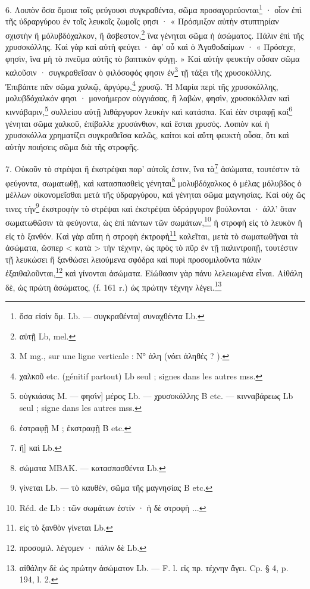 \documentclass[landscape, a4paper, 11pt, oneside, polutonikogreek, french]{article}
\begin{document}
6. Λοιπὸν ὅσα ὅμοια τοῖς φεύγουσι συγκραθέντα, σῶμα προσαγορεύονται\footnote{ὅσα εἰσὶν ὅμ. Lb. --- συγκραθέντα] συναχθέντα Lb.} · οἷον ἐπὶ τῆς ὑδραργύρου ἐν τοῖς λευκοῖς ζωμοῖς φησι · « Πρόσμιξον αὐτὴν στυπτηρίαν σχιστὴν ἢ μόλυβδόχαλκον, ἢ ἄσβεστον,\footnote{αὐτῇ Lb, mel.} ἵνα γένηται σῶμα ἡ ἀσώματος. Πάλιν ἐπὶ τῆς χρυσοκόλλης. Καὶ γὰρ καὶ αὐτὴ φεύγει · ἀφ' οὗ καὶ ὁ Ἀγαθοδαίμων · « Πρόσεχε, φησὶν, ἵνα μὴ τὸ πνεῦμα αὐτῆς τὸ βαπτικὸν φύγῃ. » Καὶ αὐτὴν φευκτὴν οὖσαν σῶμα καλοῦσιν · συγκραθεῖσαν ὁ φιλόσοφός φησιν ἐν\footnote{M mg., sur une ligne verticale : N° ἀλη (νόει ἀληθές ? ).} τῇ τάξει τῆς χρυσοκόλλης. Ἐπιβάπτε πᾶν σῶμα χαλκῷ, ἀργύρῳ,\footnote{χαλκοῦ etc. (génitif partout) Lb seul ; signes dans les autres mss.} χρυσῷ. Ἡ Μαρία περὶ τῆς χρυσοκόλλης, μολυβδόχαλκόν φησι · μονοήμερον οὐγγιάσας, ἢ λαβὼν, φησὶν, χρυσοκόλλαν καὶ κιννάβαριν,\footnote{οὐγκιάσας M. --- φησὶν] μέρος Lb. --- χρυσοκόλλης B etc. --- κινναβάρεως Lb seul ; signe dans les autres mss.} συλλείου αὐτῇ λιθάργυρον λευκὴν καὶ κατάσπα. Καὶ ἐὰν στραφῇ καὶ\footnote{ἐστραφῇ M ; ἐκστραφῇ B etc.} γένηται σῶμα χαλκοῦ, ἐπίβαλλε χρυσάνθιον, καὶ ἔσται χρυσός. Λοιπὸν καὶ ἡ χρυσοκόλλα χρηματίζει συγκραθεῖσα καλῶς, καίτοι καὶ αὕτη φευκτὴ οὖσα, ὅτι καὶ αὐτὴν ποιήσεις σῶμα διὰ τῆς στροφῆς.

7. Οὐκοῦν τὸ στρέψαι ἢ ἐκστρέψαι παρ' αὐτοῖς ἐστιν, ἵνα τὰ\footnote{ἢ] καὶ Lb.} ἀσώματα, τουτέστιν τὰ φεύγοντα, σωματωθῇ, καὶ κατασπασθεὶς γένηται\footnote{σώματα MBAK. --- κατασπασθέντα Lb.} μολυβδόχαλκος ὁ μέλας μόλυβδος ὁ μέλλων οἰκονομεῖσθαι μετὰ τῆς ὑδραργύρου, καὶ γένηται σῶμα μαγνησίας. Καὶ οὐχ ὥς τινες τὴν\footnote{γίνεται Lb. --- τὸ καυθὲν, σῶμα τῆς μαγνησίας B etc.} ἐκστροφὴν τὸ στρέψαι καὶ ἐκστρέψαι ὑδράργυρον βούλονται · ἀλλ' ὅταν σωματωθῶσιν τὰ φεύγοντα, ὡς ἐπὶ πάντων τῶν σωμάτων,\footnote{Réd. de Lb : τῶν σωμάτων ἐστίν · ἡ δὲ στροφὴ ...} ἡ στροφὴ εἰς τὸ λευκὸν ἢ εἰς τὸ ξανθόν. Καὶ γὰρ αὕτη ἡ στροφὴ ἐκτροφὴ\footnote{εἰς τὸ ξανθὸν γίνεται Lb.} καλεῖται, μετὰ τὸ σωματωθῆναι τὰ ἀσώματα, ὥσπερ < κατὰ > τὴν τέχνην, ὡς πρὸς τὸ πῦρ ἐν τῇ παλιντροπῇ, τουτέστιν τῇ λευκώσει ἢ ξανθώσει λειούμενα σφόδρα καὶ πυρὶ προσομιλοῦντα πάλιν ἐξαιθαλοῦνται,\footnote{προσομιλ. λέγομεν · πάλιν δὲ Lb.} καὶ γίνονται ἀσώματα. Εἰώθασιν γὰρ πάνυ λελειωμένα εἶναι. Αἰθάλη δὲ, ὠς πρώτη ἀσώματος, (f. 161 r.) ὡς πρώτην τέχνην λέγει.\footnote{αἰθάλην δὲ ὡς πρώτην ἀσώματον Lb. --- F. l. εἰς πρ. τέχνην ἄγει. Cp. § 4, p. 194, l. 2.}
\end{document}
